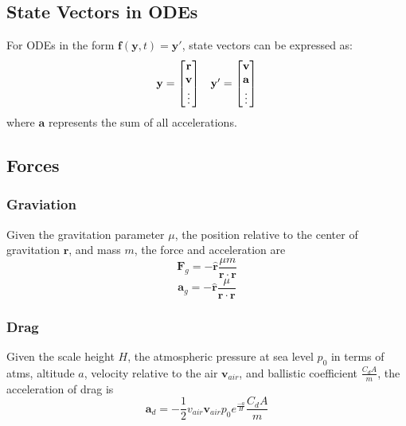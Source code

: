 \subsection{State Vectors in ODEs}
For ODEs in the form $\mathbf{f}\left(\mathbf{y},t\right) = \mathbf{y}'$, state vectors can be expressed as:
\begin{equation}
    \begin{array}{c c}
        \mathbf{y}=
        \begin{bmatrix}
            \mathbf{r} \\
            \mathbf{v} \\
            \vdots
        \end{bmatrix} &
        \mathbf{y}'=
        \begin{bmatrix}
            \mathbf{v} \\
            \mathbf{a} \\
            \vdots
        \end{bmatrix}
    \end{array}
\end{equation}
where $\mathbf{a}$ represents the sum of all accelerations.


\subsection{Forces}
\subsubsection{Graviation}
Given the gravitation parameter $\mu$, the position relative to the center of gravitation $\mathbf{r}$,
and mass $m$, the force and acceleration are
\begin{equation}
    \label{force_gravity}
    \mathbf{F}_g=-\hat{\mathbf{r}}\frac{\mu{}m}{\mathbf{r}\cdot\mathbf{r}}
\end{equation}
\begin{equation}
    \label{accel_gravity}
    \mathbf{a}_g=-\hat{\mathbf{r}}\frac{\mu}{\mathbf{r}\cdot\mathbf{r}}
\end{equation}

\subsubsection{Drag}
Given the scale height $H$, the atmospheric pressure at sea level $p_0$ in terms of atms, altitude $a$, velocity relative
to the air $\mathbf{v}_{air}$, and ballistic coefficient $\frac{C_dA}{m}$, the acceleration of drag is
\begin{equation}
    \label{accel_drag}
    \mathbf{a}_d=-\frac{1}{2}v_{air}\mathbf{v}_{air}p_0e^{\frac{-a}{H}}\frac{C_dA}{m}
\end{equation}

